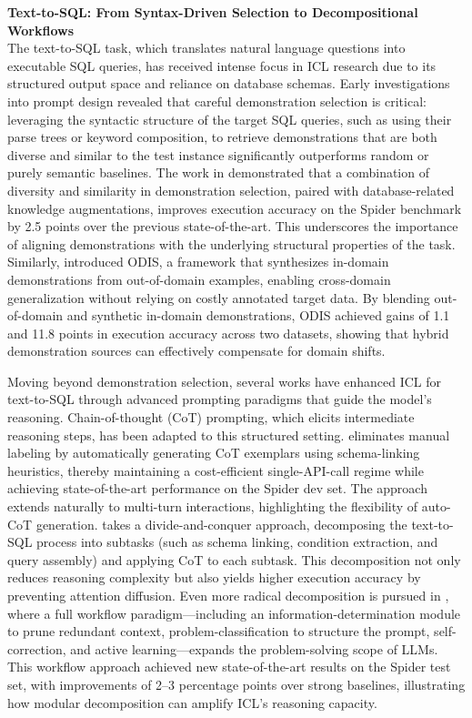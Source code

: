 \documentclass[11pt]{article}
\begin{document}
\textbf{Text-to-SQL: From Syntax-Driven Selection to Decompositional Workflows}\\
The text-to-SQL task, which translates natural language questions into executable SQL queries, has received intense focus in ICL research due to its structured output space and reliance on database schemas. Early investigations into prompt design revealed that careful demonstration selection is critical: leveraging the syntactic structure of the target SQL queries, such as using their parse trees or keyword composition, to retrieve demonstrations that are both diverse and similar to the test instance significantly outperforms random or purely semantic baselines. The work in \cite{ref162} demonstrated that a combination of diversity and similarity in demonstration selection, paired with database-related knowledge augmentations, improves execution accuracy on the Spider benchmark by 2.5 points over the previous state-of-the-art. This underscores the importance of aligning demonstrations with the underlying structural properties of the task. Similarly, \cite{ref163} introduced ODIS, a framework that synthesizes in-domain demonstrations from out-of-domain examples, enabling cross-domain generalization without relying on costly annotated target data. By blending out-of-domain and synthetic in-domain demonstrations, ODIS achieved gains of 1.1 and 11.8 points in execution accuracy across two datasets, showing that hybrid demonstration sources can effectively compensate for domain shifts.

Moving beyond demonstration selection, several works have enhanced ICL for text-to-SQL through advanced prompting paradigms that guide the model's reasoning. Chain-of-thought (CoT) prompting, which elicits intermediate reasoning steps, has been adapted to this structured setting. \cite{ref164} eliminates manual labeling by automatically generating CoT exemplars using schema-linking heuristics, thereby maintaining a cost-efficient single-API-call regime while achieving state-of-the-art performance on the Spider dev set. The approach extends naturally to multi-turn interactions, highlighting the flexibility of auto-CoT generation. \cite{ref165} takes a divide-and-conquer approach, decomposing the text-to-SQL process into subtasks (such as schema linking, condition extraction, and query assembly) and applying CoT to each subtask. This decomposition not only reduces reasoning complexity but also yields higher execution accuracy by preventing attention diffusion. Even more radical decomposition is pursued in \cite{ref166}, where a full workflow paradigm---including an information-determination module to prune redundant context, problem-classification to structure the prompt, self-correction, and active learning---expands the problem-solving scope of LLMs. This workflow approach achieved new state-of-the-art results on the Spider test set, with improvements of 2--3 percentage points over strong baselines, illustrating how modular decomposition can amplify ICL's reasoning capacity.
\end{document}
